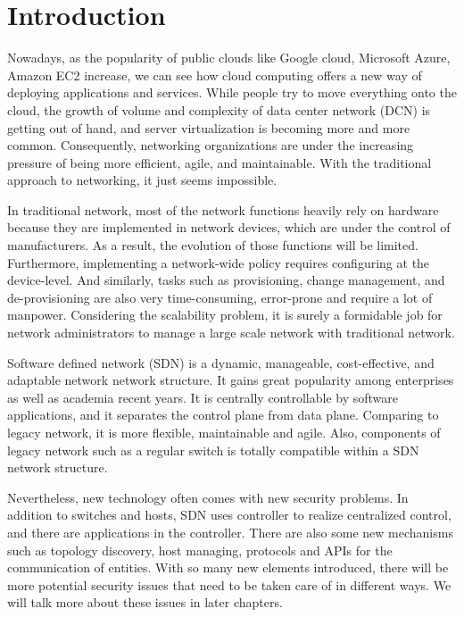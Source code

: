 \chapter{Introduction}
\label{chap:intro}
\setcounter{page}{1}

Nowadays, as the popularity of public clouds like Google cloud, Microsoft Azure, Amazon EC2 increase, we can see how cloud computing offers a new way of deploying applications and services. While people try to move everything onto the cloud, the growth of volume and complexity of data center network (DCN) is getting out of hand, and server virtualization is becoming more and more common. Consequently, networking organizations are under the increasing pressure of being more efficient, agile, and maintainable. With the traditional approach to networking, it just seems impossible.

In traditional network, most of the network functions heavily rely on hardware because they are implemented in network devices, which are under the control of manufacturers. As a result, the evolution of those functions will be limited. Furthermore, implementing a network-wide policy requires configuring at the device-level. And similarly, tasks such as provisioning, change management, and de-provisioning are also very time-consuming, error-prone and require a lot of manpower. Considering the scalability problem, it is surely a formidable job for network administrators to manage a large scale network with traditional network. 

Software defined network (SDN) is a dynamic, manageable, cost-effective, and adaptable network network structure. It gains great popularity among enterprises as well as academia recent years. It is centrally controllable by software applications, and it separates the control plane from data plane. Comparing to legacy network, it is more flexible, maintainable and agile. Also, components of legacy network such as a regular switch is totally compatible within a SDN network structure.

Nevertheless, new technology often comes with new security problems. In addition to switches and hosts, SDN uses controller to realize centralized control, and there are applications in the controller. There are also some new mechanisms such as topology discovery, host managing, protocols and APIs for the communication of entities. With so many new elements introduced, there will be more potential security issues that need to be taken care of in different ways. We will talk more about these issues in later chapters.

